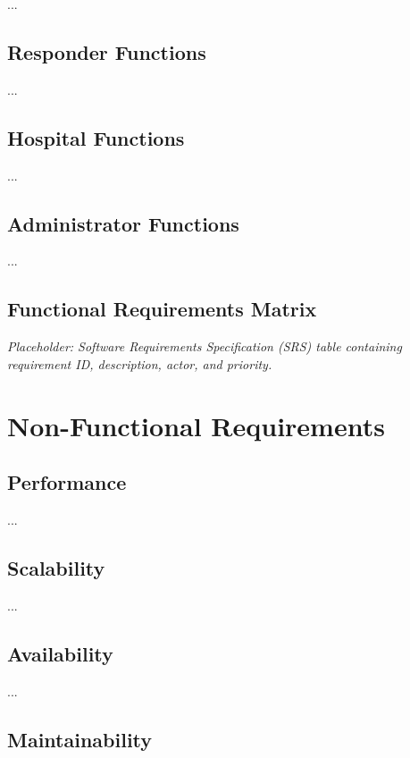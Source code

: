 ...

\subsection{Responder Functions}

...

\subsection{Hospital Functions}

...

\subsection{Administrator Functions}

...

\subsection{Functional Requirements Matrix}

\textit{Placeholder: Software Requirements Specification (SRS) table containing requirement ID, description, actor, and priority.}


\section{Non-Functional Requirements}


\subsection{Performance}

...

\subsection{Scalability}

...

\subsection{Availability}

...

\subsection{Maintainability}

